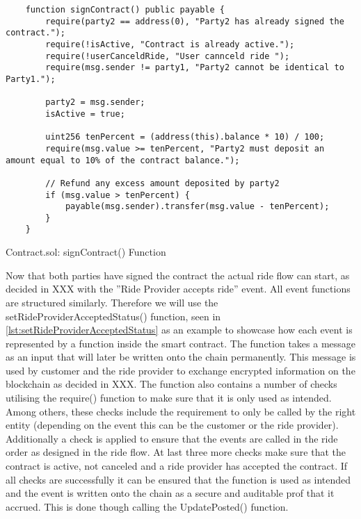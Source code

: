 \begin{Listing}
\begin{lstlisting}
    function signContract() public payable {
        require(party2 == address(0), "Party2 has already signed the contract.");
        require(!isActive, "Contract is already active.");
        require(!userCanceldRide, "User cannceld ride ");
        require(msg.sender != party1, "Party2 cannot be identical to Party1.");
        
        party2 = msg.sender;
        isActive = true;

        uint256 tenPercent = (address(this).balance * 10) / 100;
        require(msg.value >= tenPercent, "Party2 must deposit an amount equal to 10% of the contract balance.");

        // Refund any excess amount deposited by party2
        if (msg.value > tenPercent) {
            payable(msg.sender).transfer(msg.value - tenPercent);
        }
    }
\end{lstlisting}
  \caption{Contract.sol: signContract() Function}
  \label{lst:signContract}
\end{Listing}

Now that both parties have signed the contract the actual ride flow can start, as decided in XXX with the ''Ride Provider accepts ride'' event. All event functions are structured similarly. Therefore we will use the setRideProviderAcceptedStatus() function, seen in \ref{lst:setRideProviderAcceptedStatus} as an example to showcase how each event is represented by a function inside the smart contract. The function takes a message as an input that will later be written onto the chain permanently. This message is used by customer and the ride provider to exchange encrypted information on the blockchain as decided in XXX. The function also contains a number of checks utilising the require() function to make sure that it is only used as intended. Among others, these checks include the requirement to only be called by the right entity (depending on the event this can be the customer or the ride provider). Additionally a check is applied to ensure that the events are called in the ride order as designed in the ride flow. At last three more checks make sure that the contract is active, not canceled and a ride provider has accepted the contract. If all checks are successfully it can be ensured that the function is used as intended and the event is written onto the chain as a secure and auditable prof that it accrued. This is done though calling the UpdatePosted() function.

